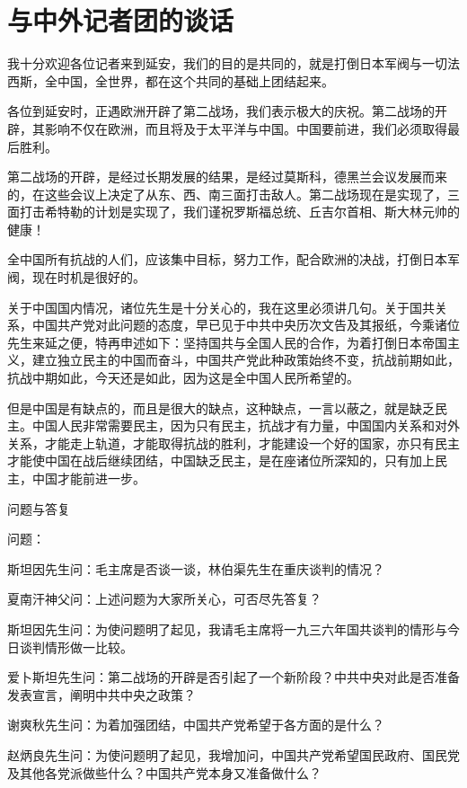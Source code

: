 \section[与中外记者团的谈话（一九四四年六月十三日）]{与中外记者团的谈话}


我十分欢迎各位记者来到延安，我们的目的是共同的，就是打倒日本军阀与一切法西斯，全中国，全世界，都在这个共同的基础上团结起来。

各位到延安时，正遇欧洲开辟了第二战场，我们表示极大的庆祝。第二战场的开辟，其影响不仅在欧洲，而且将及于太平洋与中国。中国要前进，我们必须取得最后胜利。

第二战场的开辟，是经过长期发展的结果，是经过莫斯科，德黑兰会议发展而来的，在这些会议上决定了从东、西、南三面打击敌人。第二战场现在是实现了，三面打击希特勒的计划是实现了，我们谨祝罗斯福总统、丘吉尔首相、斯大林元帅的健康！

全中国所有抗战的人们，应该集中目标，努力工作，配合欧洲的决战，打倒日本军阀，现在时机是很好的。

关于中国国内情况，诸位先生是十分关心的，我在这里必须讲几句。关于国共关系，中国共产党对此问题的态度，早已见于中共中央历次文告及其报纸，今乘诸位先生来延之便，特再申述如下：坚持国共与全国人民的合作，为着打倒日本帝国主义，建立独立民主的中国而奋斗，中国共产党此种政策始终不变，抗战前期如此，抗战中期如此，今天还是如此，因为这是全中国人民所希望的。

但是中国是有缺点的，而且是很大的缺点，这种缺点，一言以蔽之，就是缺乏民主。中国人民非常需要民主，因为只有民主，抗战才有力量，中国国内关系和对外关系，才能走上轨道，才能取得抗战的胜利，才能建设一个好的国家，亦只有民主才能使中国在战后继续团结，中国缺乏民主，是在座诸位所深知的，只有加上民主，中国才能前进一步。


问题与答复

问题：

斯坦因先生问：毛主席是否谈一谈，林伯渠先生在重庆谈判的情况？

夏南汗神父问：上述问题为大家所关心，可否尽先答复？

斯坦因先生问：为使问题明了起见，我请毛主席将一九三六年国共谈判的情形与今日谈判情形做一比较。

爱卜斯坦先生问：第二战场的开辟是否引起了一个新阶段？中共中央对此是否准备发表宣言，阐明中共中央之政策？

谢爽秋先生问：为着加强团结，中国共产党希望于各方面的是什么？

赵炳良先生问：为使问题明了起见，我增加问，中国共产党希望国民政府、国民党及其他各党派做些什么？中国共产党本身又准备做什么？

